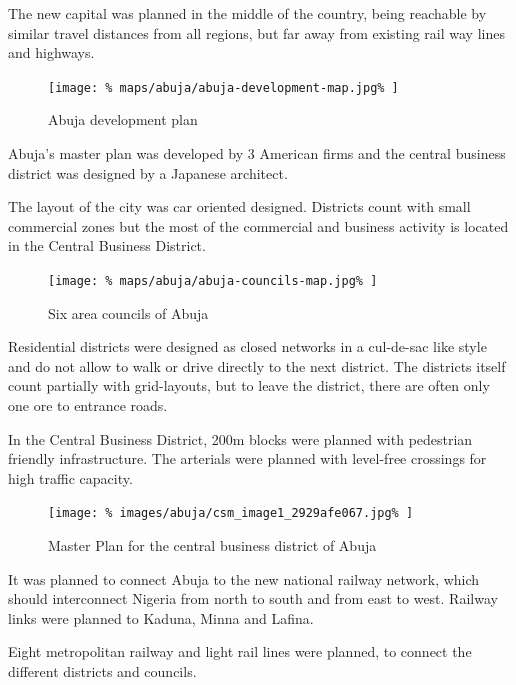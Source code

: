 \documentclass[twocolumn]{article}
\begin{document}
			The new capital was planned in the middle of the country, being reachable by similar travel distances from all regions, but far away from existing rail way lines and highways.
			
			\begin{figure}[H]
				\texttt{[image: \%
					maps/abuja/abuja-development-map.jpg\%
				]}
				\caption{Abuja development plan\cite{NairalandForum:AbujaMap}}
				\label{fig:map:abuja-development-plan}
			\end{figure}
			
			Abuja's master plan was developed by 3 American firms and the central business district was designed by a Japanese architect.
			
			The layout of the city was car oriented designed. Districts count with small commercial zones but the most of the commercial and business activity is located in the Central Business District.
			
			\begin{figure}[H]
				\texttt{[image: \%
					maps/abuja/abuja-councils-map.jpg\%
				]}
				\caption{Six area councils of Abuja\cite{ResearchGate:SixCouncils}}
				\label{fig:map:abuja-six-area-councils}
			\end{figure}
			
			Residential districts were designed as closed networks in a cul-de-sac like style and do not allow to walk or drive directly to the next district. The districts itself count partially with grid-layouts, but to leave the district, there are often only one ore to entrance roads.
			
			In the Central Business District, 200m blocks were planned with pedestrian friendly infrastructure.
			The arterials were planned with level-free crossings for high traffic capacity.
			
			\begin{figure}[H]
				\texttt{[image: \%
					images/abuja/csm\_image1\_2929afe067.jpg\%
				]}
				\caption{Master Plan for the central business district of Abuja\cite{ASplusP:MasterPlanReview}}
				\label{fig:map:abuja-master-plan-cbd}
			\end{figure}	
			
			It was planned to connect Abuja to the new national railway network, which should interconnect Nigeria from north to south and from east to west.
			Railway links were planned to Kaduna, Minna and Lafina.
			
			Eight metropolitan railway and light rail lines were planned, to connect the different districts and councils. 
			
\end{document}
